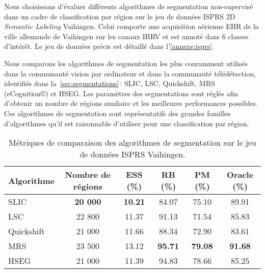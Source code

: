 Nous choisissons d'évaluer différents algorithmes de segmentation non-supervisé dans un cadre de classification par région sur le jeu de données \gls{ISPRS} 2D \emph{Semantic Labeling} Vaihingen. Celui comporte une acquisition aérienne \gls{EHR} de la ville allemande de Vaihingen sur les canaux \gls{IRRV} et est annoté dans 6 classes d'intérêt. Le jeu de données précis est détaillé dans l'\cref{annexe:isprs}.

Nous comparons les algorithmes de segmentation les plus couramment utilisés dans la communauté vision par ordinateur et dans la communauté télédétection, identifiés dans la~\cref{sec:segmentations}\,: \gls{SLIC}, \gls{LSC}, Quickshift, \gls{MRS} (eCognition\copyright) et \gls{HSEG}. Les paramètres des segmentations sont réglés afin d'obtenir un nombre de régions similaire et les meilleures performances possibles. Ces algorithmes de segmentation sont représentatifs des grandes familles d'algorithmes qu'il est raisonnable d'utiliser pour une classification par région.

\begin{table}
  \centering
  \setlength{\tabcolsep}{10pt}
  \begin{tabularx}{\textwidth}{ Y c c c c c }
  \toprule
  Algorithme & Nombre de régions & ESS (\%) & RB (\%) & PM (\%) & Oracle (\%)\\
  \midrule
  \gls{SLIC} & \textbf{20 000} & \textbf{10.21} & 84.07 & 75.10 & 89.91\\
  \gls{LSC} & 22 800 & 11.37 & 91.13 & 71.54 & 85.83\\
  Quickshift & 21 000 & 11.66 & 88.34 & 72.90 & 83.61\\
  \cmidrule(lr){1-6}
  \gls{MRS} & 23 500 & 13.12 & \textbf{95.71} & \textbf{79.08} & \textbf{91.68}\\
  \gls{HSEG} & 21 000 & 11.39 & 94.83 & 78.66 & 85.25\\
  \bottomrule
  \end{tabularx}
  \caption{Métriques de comparaison des algorithmes de segmentation sur le jeu de données \gls{ISPRS} Vaihingen.}
  \label{table:segmentation_metrics}
\end{table}

